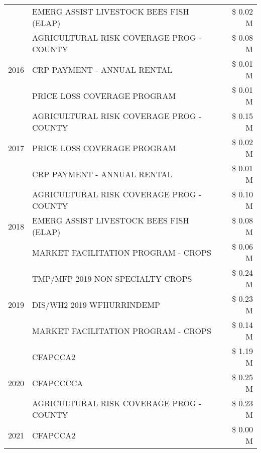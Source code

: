 \begin{tabular}{llr}
 & EMERG ASSIST LIVESTOCK BEES FISH (ELAP) & \$ 0.02 M \\
\cline{1-3}
\multirow[t]{3}{*}{2016} & AGRICULTURAL RISK COVERAGE PROG - COUNTY & \$ 0.08 M \\
 & CRP PAYMENT - ANNUAL RENTAL & \$ 0.01 M \\
 & PRICE LOSS COVERAGE PROGRAM & \$ 0.01 M \\
\cline{1-3}
\multirow[t]{3}{*}{2017} & AGRICULTURAL RISK COVERAGE PROG - COUNTY & \$ 0.15 M \\
 & PRICE LOSS COVERAGE PROGRAM & \$ 0.02 M \\
 & CRP PAYMENT - ANNUAL RENTAL & \$ 0.01 M \\
\cline{1-3}
\multirow[t]{3}{*}{2018} & AGRICULTURAL RISK COVERAGE PROG - COUNTY & \$ 0.10 M \\
 & EMERG ASSIST LIVESTOCK BEES FISH (ELAP) & \$ 0.08 M \\
 & MARKET FACILITATION PROGRAM - CROPS & \$ 0.06 M \\
\cline{1-3}
\multirow[t]{3}{*}{2019} & TMP/MFP 2019 NON SPECIALTY CROPS & \$ 0.24 M \\
 & DIS/WH2 2019 WFHURRINDEMP & \$ 0.23 M \\
 & MARKET FACILITATION PROGRAM - CROPS & \$ 0.14 M \\
\cline{1-3}
\multirow[t]{3}{*}{2020} & CFAPCCA2 & \$ 1.19 M \\
 & CFAPCCCCA & \$ 0.25 M \\
 & AGRICULTURAL RISK COVERAGE PROG - COUNTY & \$ 0.23 M \\
\cline{1-3}
2021 & CFAPCCA2 & \$ 0.00 M \\
\cline{1-3}
\bottomrule
\end{tabular}
